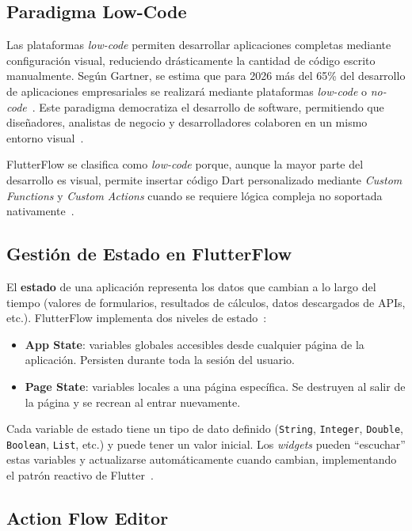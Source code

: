 \documentclass[12pt,a4paper]{article}
\begin{document}
\subsection{Paradigma Low-Code}

Las plataformas \textit{low-code} permiten desarrollar aplicaciones completas mediante configuración visual, reduciendo drásticamente la cantidad de código escrito manualmente. Según Gartner, se estima que para 2026 más del 65\% del desarrollo de aplicaciones empresariales se realizará mediante plataformas \textit{low-code} o \textit{no-code}~\cite{gartner2023}. Este paradigma democratiza el desarrollo de software, permitiendo que diseñadores, analistas de negocio y desarrolladores colaboren en un mismo entorno visual~\cite{lowcode2023}.

FlutterFlow se clasifica como \textit{low-code} porque, aunque la mayor parte del desarrollo es visual, permite insertar código Dart personalizado mediante \textit{Custom Functions} y \textit{Custom Actions} cuando se requiere lógica compleja no soportada nativamente~\cite{flutterflow2024}.

\subsection{Gestión de Estado en FlutterFlow}

El \textbf{estado} de una aplicación representa los datos que cambian a lo largo del tiempo (valores de formularios, resultados de cálculos, datos descargados de APIs, etc.). FlutterFlow implementa dos niveles de estado~\cite{flutterflow2024}:

\begin{itemize}
  \item \textbf{App State}: variables globales accesibles desde cualquier página de la aplicación. Persisten durante toda la sesión del usuario.
  \item \textbf{Page State}: variables locales a una página específica. Se destruyen al salir de la página y se recrean al entrar nuevamente.
\end{itemize}

Cada variable de estado tiene un tipo de dato definido (\texttt{String}, \texttt{Integer}, \texttt{Double}, \texttt{Boolean}, \texttt{List}, etc.) y puede tener un valor inicial. Los \textit{widgets} pueden ``escuchar'' estas variables y actualizarse automáticamente cuando cambian, implementando el patrón reactivo de Flutter~\cite{flutter2024}.

\subsection{Action Flow Editor}
\end{document}
